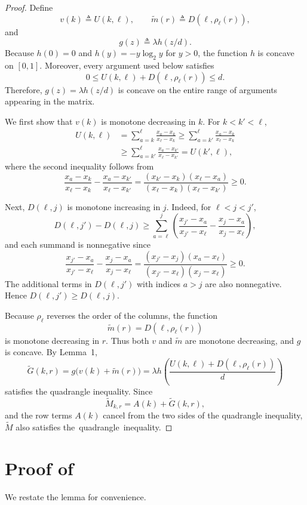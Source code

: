 \documentclass[11pt,letterpaper]{article}
\begin{document}
{\begin{proof}
Define
\[
v(k)\triangleq U(k,\ell),
        \qquad
\widetilde m(r)\triangleq D(\ell,\rho_\ell(r)),
\]
and
\[
g(z)\triangleq \lambda h(z/d).
\]
Because $h(0)=0$ and $h(y)=-y\log_2 y$ for $y>0$, the function $h$ is concave on $[0,1]$. Moreover, every argument used below satisfies \[0\le U(k,\ell)+D(\ell,\rho_\ell(r))\le d.\]
Therefore, $g(z)=\lambda h(z/d)$ is concave on the entire range of arguments appearing in the matrix.

We first show that $v(k)$ is monotone decreasing in $k$. For
$k<k'<\ell$,
\[
\begin{aligned}
U(k,\ell)
&=\sum_{a=k}^{\ell}\frac{x_a-x_k}{x_\ell-x_k}\ge\sum_{a=k'}^{\ell}\frac{x_a-x_k}{x_\ell-x_k}\\
&\ge\sum_{a=k'}^{\ell}\frac{x_a-x_{k'}}{x_\ell-x_{k'}}=U(k',\ell),
\end{aligned}
\]
where the second inequality follows from
\[
\frac{x_a-x_k}{x_\ell-x_k}
-
\frac{x_a-x_{k'}}{x_\ell-x_{k'}}
=
\frac{(x_{k'}-x_k)(x_\ell-x_a)}
     {(x_\ell-x_k)(x_\ell-x_{k'})}
\ge 0 .
\]

Next, $D(\ell,j)$ is monotone increasing in $j$. Indeed, for
$\ell<j<j'$,
\[
D(\ell,j')
-
D(\ell,j)
\ge
\sum_{a=\ell}^{j}
\left(
\frac{x_{j'}-x_a}{x_{j'}-x_\ell}
-
\frac{x_j-x_a}{x_j-x_\ell}
\right),
\]
and each summand is nonnegative since
\[
\frac{x_{j'}-x_a}{x_{j'}-x_\ell}
-
\frac{x_j-x_a}{x_j-x_\ell}
=
\frac{(x_{j'}-x_j)(x_a-x_\ell)}
     {(x_{j'}-x_\ell)(x_j-x_\ell)}
\ge 0 .
\]
The additional terms in $D(\ell,j')$ with indices $a>j$ are also
nonnegative. Hence $D(\ell,j')\ge D(\ell,j)$.

Because $\rho_\ell$ reverses the order of the columns, the function
\[
\widetilde m(r)=D(\ell,\rho_\ell(r))
\]
is monotone decreasing in $r$. Thus both $v$ and $\widetilde m$ are
monotone decreasing, and $g$ is concave. By Lemma~1,
\[
\widetilde G(k,r)
=
g\bigl(v(k)+\widetilde m(r)\bigr)
=
\lambda h\!\left(
\frac{U(k,\ell)+D(\ell,\rho_\ell(r))}{d}
\right)
\]
satisfies the quadrangle inequality. Since
\[
\widetilde M_{k,r}=A(k)+\widetilde G(k,r),
\]
and the row terms $A(k)$ cancel from the two sides of the quadrangle
inequality, $\widetilde M$ also satisfies \mbox{the quadrangle inequality.}
\end{proof}

\section{Proof of~}\label{app:Hirschberg_opt}
We restate the lemma for convenience. 
\Hirschbergopt*

}
\end{document}
